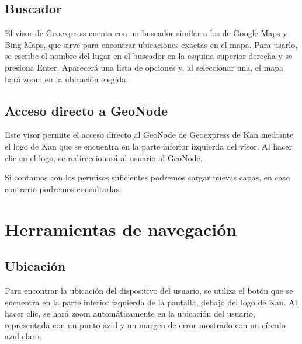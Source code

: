 \documentclass[a4paper,11pt,spanish]{sphinxmanual}
\begin{document}
\subsection{Buscador}
\label{\detokenize{search/search:buscador}}\label{\detokenize{search/search::doc}}

\sphinxAtStartPar
El visor de Geoexpress cuenta con un buscador similar a los de Google Maps y Bing Maps, que sirve para encontrar ubicaciones exactas en el mapa. Para usarlo, se escribe el nombre del lugar en el buscador en la esquina superior derecha y se presiona Enter. Aparecerá una lista de opciones y, al seleccionar una, el mapa hará zoom en la ubicación elegida.

\sphinxstepscope


\subsection{Acceso directo a GeoNode}
\label{\detokenize{search/geonode:acceso-directo-a-geonode}}\label{\detokenize{search/geonode::doc}}
\sphinxAtStartPar
Este visor permite el acceso directo al GeoNode de Geoexpress de Kan  mediante el logo de Kan que se encuentra en la parte inferior izquierda del visor. Al hacer clic en el logo, se redireccionará al usuario al GeoNode.


\sphinxAtStartPar
Si contamos con los permisos suficientes podremos cargar nuevas capas, en caso contrario podremos consultarlas.


\sphinxstepscope


\section{Herramientas de navegación}
\label{\detokenize{tools/index:herramientas-de-navegacion}}\label{\detokenize{tools/index::doc}}
\sphinxstepscope


\subsection{Ubicación}
\label{\detokenize{tools/location:ubicacion}}\label{\detokenize{tools/location::doc}}
\sphinxAtStartPar
Para encontrar la ubicación del dispositivo del usuario, se utiliza el botón que se encuentra en la parte inferior izquierda de la pantalla, debajo del logo de Kan. Al hacer clic, se hará zoom automáticamente en la ubicación del usuario, representada con un punto azul y un margen de error mostrado con un círculo azul claro.
\end{document}
